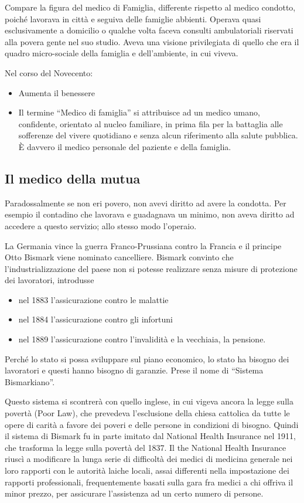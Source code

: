 Compare la figura del medico di Famiglia, differente rispetto al medico
condotto, poiché lavorava in città e seguiva delle famiglie abbienti.
Operava quasi esclusivamente a domicilio o qualche volta faceva consulti
ambulatoriali riservati alla povera gente nel suo studio. Aveva una
visione privilegiata di quello che era il quadro micro-sociale della
famiglia e dell'ambiente, in cui viveva.

Nel corso del Novecento:
\begin{itemize}
\item Aumenta il benessere
\item Il termine ``Medico di famiglia'' si attribuisce ad un medico umano,
confidente, orientato al nucleo familiare, in prima fila per la
battaglia alle sofferenze del vivere quotidiano e senza alcun
riferimento alla salute pubblica. È davvero il medico personale del
paziente e della famiglia.
\end{itemize}

\subsection{Il medico della mutua}

Paradossalmente se non eri povero, non avevi diritto ad avere la
condotta. Per esempio il contadino che lavorava e guadagnava un minimo,
non aveva diritto ad accedere a questo servizio; allo stesso modo
l'operaio.

La Germania vince la guerra Franco-Prussiana contro la Francia e il
principe Otto Bismark viene nominato cancelliere. Bismark convinto che
l'industrializzazione del paese non si potesse realizzare senza misure
di protezione dei lavoratori, introdusse
\begin{itemize}
\item nel 1883 l'assicurazione contro le malattie
\item nel 1884 l'assicurazione contro gli infortuni
\item nel 1889 l'assicurazione contro l'invalidità e la vecchiaia, la
pensione.
\end{itemize}

Perché lo stato si possa sviluppare sul piano economico, lo stato ha
bisogno dei lavoratori e questi hanno bisogno di garanzie. Prese il nome
di ``Sistema Bismarkiano''.

Questo sistema si scontrerà con quello inglese, in cui vigeva ancora la
legge sulla povertà (Poor Law), che prevedeva l'esclusione della chiesa
cattolica da tutte le opere di carità a favore dei poveri e delle
persone in condizioni di bisogno. Quindi il sistema di Bismark fu in
parte imitato dal National Health Insurance nel 1911, che trasforma la
legge sulla povertà del 1837. Il the National Health Insurance riuscì a
modificare la lunga serie di difficoltà dei medici di medicina generale
nei loro rapporti con le autorità laiche locali, assai differenti nella
impostazione dei rapporti professionali, frequentemente basati sulla
gara fra medici a chi offriva il minor prezzo, per assicurare
l'assistenza ad un certo numero di persone.

